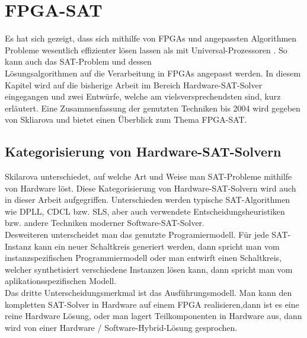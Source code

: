 \section{FPGA-SAT}
Es hat sich gezeigt, dass sich mithilfe von FPGAs und angepassten 
Algorithmen Probleme wesentlich effizienter lösen lassen
als mit Universal-Prozessoren \cite{preusser:2009}\cite{dietrich:2009}. 
So kann auch das SAT-Problem und dessen\\Lösungsalgorithmen 
auf die Verarbeitung in FPGAs angepasst werden.
In diesem Kapitel wird auf die bisherige Arbeit im Bereich
Hardware-SAT-Solver eingegangen und zwei Entwürfe, welche
am vielsversprechendsten sind, kurz erläutert. 
Eine Zusammenfassung der genutzten 
Techniken bis 2004 wird gegeben von
Skliarova \cite{ferrari:2004} und
bietet einen Überblick zum Thema FPGA-SAT.

\subsection{Kategorisierung von Hardware-SAT-Solvern}
Skilarova \cite{ferrari:2004} unterschiedet, auf welche Art
und Weise man SAT-Probleme mithilfe von Hardware löst. 
Diese Kategorisierung von Hardware-SAT-Solvern wird auch in dieser Arbeit
aufgegriffen. Unterschieden werden typische SAT-Algorithmen wie DPLL, CDCL bzw. SLS, 
aber auch verwendete Entscheidungsheuristiken bzw. andere Techniken moderner
Software-SAT-Solver.\\
Desweiteren unterscheidet man das genutzte Programiermodell.
Für jede SAT-Instanz kann ein neuer Schaltkreis 
generiert werden, dann spricht man vom instanzspezifischen Programmiermodell 
oder man entwirft einen Schaltkreis, welcher 
synthetisiert verschiedene Instanzen 
lösen kann, dann spricht man vom aplikationsspezifischen Modell.\\
Das dritte Unterscheidungsmerkmal ist das Ausführungsmodell. 
Man kann den kompletten SAT-Solver in Hardware auf einem FPGA 
realisieren,dann ist es eine reine Hardware Lösung, oder man lagert
Teilkomponenten in Hardware aus, 
dann wird von einer Hardware / Software-Hybrid-Lösung gesprochen.\\

